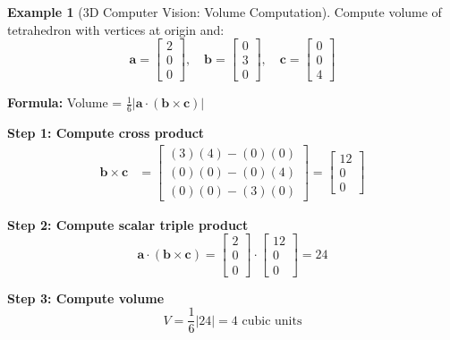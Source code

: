 \documentclass[12pt,a4paper]{article}
\theoremstyle{definition}
\newtheorem{example}{Example}[section]
\begin{document}
\begin{example}[3D Computer Vision: Volume Computation]
Compute volume of tetrahedron with vertices at origin and:
\begin{equation}
\mathbf{a} = \begin{bmatrix} 2 \\ 0 \\ 0 \end{bmatrix}, \quad
\mathbf{b} = \begin{bmatrix} 0 \\ 3 \\ 0 \end{bmatrix}, \quad
\mathbf{c} = \begin{bmatrix} 0 \\ 0 \\ 4 \end{bmatrix}
\end{equation}

\textbf{Formula:} Volume = $\frac{1}{6}|\mathbf{a} \cdot (\mathbf{b} \times \mathbf{c})|$

\textbf{Step 1: Compute cross product}
\begin{align}
\mathbf{b} \times \mathbf{c} &= \begin{bmatrix}
(3)(4) - (0)(0) \\
(0)(0) - (0)(4) \\
(0)(0) - (3)(0)
\end{bmatrix} = \begin{bmatrix}
12 \\
0 \\
0
\end{bmatrix}
\end{align}

\textbf{Step 2: Compute scalar triple product}
\begin{equation}
\mathbf{a} \cdot (\mathbf{b} \times \mathbf{c}) = \begin{bmatrix} 2 \\ 0 \\ 0 \end{bmatrix} \cdot \begin{bmatrix} 12 \\ 0 \\ 0 \end{bmatrix} = 24
\end{equation}

\textbf{Step 3: Compute volume}
\begin{equation}
V = \frac{1}{6}|24| = 4 \text{ cubic units}
\end{equation}


\end{example}
\end{document}
